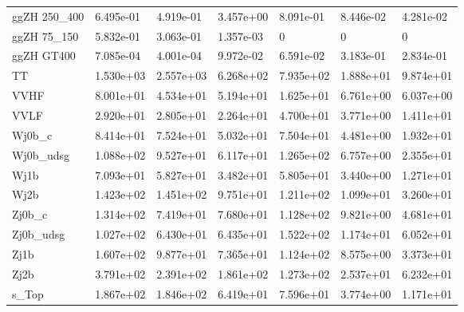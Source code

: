 \begin{table}
{\begin{tabularx}{\textwidth}{|X|X|X|X|X|X|X|}
ggZH 250\_400 & 6.495e-01 & 4.919e-01 & 3.457e+00 & 8.091e-01 & 8.446e-02 & 4.281e-02 \\
ggZH 75\_150 & 5.832e-01 & 3.063e-01 & 1.357e-03 & 0 & 0 & 0 \\
ggZH GT400 & 7.085e-04 & 4.001e-04 & 9.972e-02 & 6.591e-02 & 3.183e-01 & 2.834e-01 \\
\hline
TT & 1.530e+03 & 2.557e+03 & 6.268e+02 & 7.935e+02 & 1.888e+01 & 9.874e+01 \\
VVHF & 8.001e+01 & 4.534e+01 & 5.194e+01 & 1.625e+01 & 6.761e+00 & 6.037e+00 \\
VVLF & 2.920e+01 & 2.805e+01 & 2.264e+01 & 4.700e+01 & 3.771e+00 & 1.411e+01 \\
Wj0b\_c & 8.414e+01 & 7.524e+01 & 5.032e+01 & 7.504e+01 & 4.481e+00 & 1.932e+01 \\
Wj0b\_udsg & 1.088e+02 & 9.527e+01 & 6.117e+01 & 1.265e+02 & 6.757e+00 & 2.355e+01 \\
Wj1b & 7.093e+01 & 5.827e+01 & 3.482e+01 & 5.805e+01 & 3.440e+00 & 1.271e+01 \\
Wj2b & 1.423e+02 & 1.451e+02 & 9.751e+01 & 1.211e+02 & 1.099e+01 & 3.260e+01 \\
Zj0b\_c & 1.314e+02 & 7.419e+01 & 7.680e+01 & 1.128e+02 & 9.821e+00 & 4.681e+01 \\
Zj0b\_udsg & 1.027e+02 & 6.430e+01 & 6.435e+01 & 1.522e+02 & 1.174e+01 & 6.052e+01 \\
Zj1b & 1.607e+02 & 9.877e+01 & 7.365e+01 & 1.124e+02 & 8.575e+00 & 3.373e+01 \\
Zj2b & 3.791e+02 & 2.391e+02 & 1.861e+02 & 1.273e+02 & 2.537e+01 & 6.232e+01 \\
s\_Top & 1.867e+02 & 1.846e+02 & 6.419e+01 & 7.596e+01 & 3.774e+00 & 1.171e+01 \\
\hline
\end{tabularx}
}
\label{tab:sr-Znn-2016}
\end{table}

